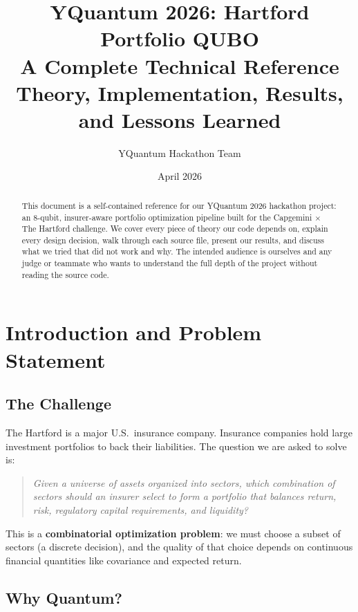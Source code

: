 \documentclass[12pt, a4paper]{article}
\title{
    \textbf{YQuantum 2026: Hartford Portfolio QUBO} \\[0.5em]
    \large A Complete Technical Reference \\[0.3em]
    \large Theory, Implementation, Results, and Lessons Learned
}
\author{YQuantum Hackathon Team}
\date{April 2026}
\begin{document}
\maketitle
\thispagestyle{empty}

\begin{abstract}
This document is a self-contained reference for our YQuantum 2026 hackathon project:
an 8-qubit, insurer-aware portfolio optimization pipeline built for the
Capgemini $\times$ The Hartford challenge. We cover every piece of theory our
code depends on, explain every design decision, walk through each source file,
present our results, and discuss what we tried that did not work and why. The
intended audience is ourselves and any judge or teammate who wants to understand
the full depth of the project without reading the source code.
\end{abstract}

\newpage
\tableofcontents
\newpage

\section{Introduction and Problem Statement}

\subsection{The Challenge}

The Hartford is a major U.S.\ insurance company. Insurance companies hold large
investment portfolios to back their liabilities. The question we are asked to
solve is:

\begin{quote}
\textit{Given a universe of assets organized into sectors, which combination of
sectors should an insurer select to form a portfolio that balances return, risk,
regulatory capital requirements, and liquidity?}
\end{quote}

This is a \textbf{combinatorial optimization problem}: we must choose a subset
of sectors (a discrete decision), and the quality of that choice depends on
continuous financial quantities like covariance and expected return.

\subsection{Why Quantum?}
\end{document}
